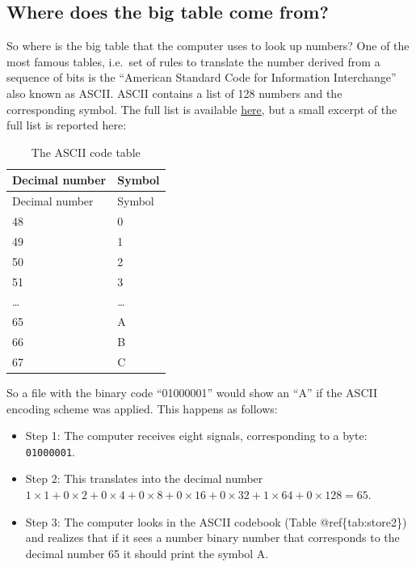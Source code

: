 \documentclass[
]{book}
\providecommand{\tightlist}{%
  \setlength{\itemsep}{0pt}\setlength{\parskip}{0pt}}
\begin{document}
\hypertarget{where-does-the-big-table-come-from}{%
\subsection*{Where does the big table come from?}\label{where-does-the-big-table-come-from}}

So where is the big table that the computer uses to look up numbers? One of the most famous tables, i.e.~set of rules to translate the number derived from a sequence of bits is the ``American Standard Code for Information Interchange'' also known as ASCII. ASCII contains a list of 128 numbers and the corresponding symbol. The full list is available \href{https://ascii.cl/}{here}, but a small excerpt of the full list is reported here:

\begin{longtable}[]{@{}ll@{}}
\caption{\label{tab:storet1} The ASCII code table}\tabularnewline
\toprule
Decimal number & Symbol \\
\midrule
\endfirsthead
\toprule
Decimal number & Symbol \\
\midrule
\endhead
48 & 0 \\
49 & 1 \\
50 & 2 \\
51 & 3 \\
\ldots{} & \ldots{} \\
65 & A \\
66 & B \\
67 & C \\
\bottomrule
\end{longtable}

So a file with the binary code ``01000001'' would show an ``A'' if the ASCII encoding scheme was applied. This happens as follows:

\begin{itemize}
\tightlist
\item
  Step 1: The computer receives eight signals, corresponding to a byte: \texttt{01000001}.
\item
  Step 2: This translates into the decimal number \(1 \times 1+0\times 2+0\times 4 +0\times 8 +0\times 16 +0\times 32 +1\times 64 +0\times 128=65\).
\item
  Step 3: The computer looks in the ASCII codebook (Table @ref\{tab:store2\}) and realizes that if it sees a number binary number that corresponds to the decimal number 65 it should print the symbol A.
\end{itemize}
\end{document}
